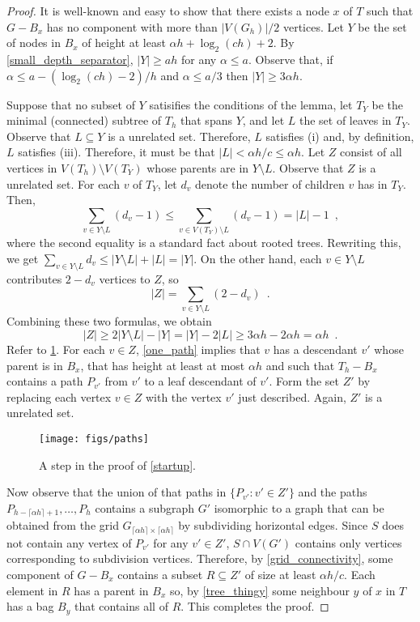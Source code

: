 \documentclass{patmorin}
\renewcommand{\le}{\leqslant}
\renewcommand{\ge}{\geqslant}
\begin{document}
\begin{proof}
  It is well-known and easy to show that there exists a node $x$ of $T$ such that $G-B_x$ has no component with more than $|V(G_h)|/2$ vertices.  Let $Y$ be the set of nodes in $B_x$ of height at least $\alpha h+\log_2(ch)+2$. By \cref{small_depth_separator}, $|Y|\ge ah$ for any $\alpha\le a$.  Observe that, if $\alpha \le a-(\log_2(ch)-2)/h$ and $\alpha \le a/3$ then $|Y|\ge 3\alpha h$.

  Suppose that no subset of $Y$ satisifies the conditions of the lemma, let $T_Y$ be the minimal (connected) subtree of $T_h$ that spans $Y$, and let $L$ the set of leaves in $T_Y$.  Observe that $L\subseteq Y$ is a unrelated set. Therefore, $L$ satisfies (i) and, by definition, $L$ satisfies (iii).  Therefore, it must be that $|L|<\alpha h/c\le\alpha h$.  Let $Z$ consist of all vertices in $V(T_h)\setminus V(T_Y)$ whose parents are in $Y\setminus L$.   Observe that $Z$ is a unrelated set. For each $v$ of $T_Y$, let $d_v$ denote the number of children $v$ has in $T_Y$.  Then,
  \[
     \sum_{v\in Y\setminus L} (d_v-1)
     \le \sum_{v\in V(T_Y)\setminus L} (d_v-1)
     = |L|-1 \enspace ,
  \]
  where the second equality is a standard fact about rooted trees.
  Rewriting this, we get $\sum_{v\in Y\setminus L} {d_v} \le |Y\setminus L| + |L| = |Y|$.  On the other hand, each $v\in Y\setminus L$ contributes $2-d_v$ vertices to $Z$, so
  \[
    |Z| = \sum_{v\in Y\setminus L} (2-d_v) \enspace .
  \]
  Combining these two formulas, we obtain
  \[
    |Z| \ge 2|Y\setminus L| - |Y| = |Y| - 2|L| \ge
     3\alpha h - 2\alpha h = \alpha h \enspace .
  \]
  Refer to \cref{paths}.  For each $v\in Z$, \cref{one_path} implies that $v$ has a descendant $v'$ whose parent is in $B_x$, that has height at least at most $\alpha h$ and such that $T_h-B_x$ contains a path $P_{v'}$ from $v'$ to a leaf descendant of $v'$.  Form the set $Z'$ by replacing each vertex $v\in Z$ with the vertex $v'$ just described.  Again, $Z'$ is a unrelated set.

  \begin{figure}
    \begin{center}
      \texttt{[image: figs/paths]}
    \end{center}
    \caption{A step in the proof of \cref{startup}.}
    \label{paths}
  \end{figure}

  Now observe that the union of that paths in  $\{P_{v'}:v'\in Z'\}$ and the paths $P_{h-\lceil\alpha h\rceil+1},\ldots,P_{h}$ contains a subgraph $G'$ isomorphic to a graph that can be obtained from the grid $G_{\lceil\alpha h\rceil\times\lceil\alpha h\rceil}$ by subdividing horizontal edges.  Since $S$ does not contain any vertex of $P_{v'}$ for any $v'\in Z'$,  $S\cap V(G')$ contains only vertices corresponding to subdivision vertices.  Therefore, by \cref{grid_connectivity}, some component of $G-B_x$ contains a subset $R\subseteq Z'$ of size at least $\alpha h/c$.  Each element in $R$ has a parent in $B_x$ so, by \cref{tree_thingy} some neighbour $y$ of $x$ in $T$ has a bag $B_y$ that contains all of $R$.  This completes the proof.
\end{proof}
\end{document}
